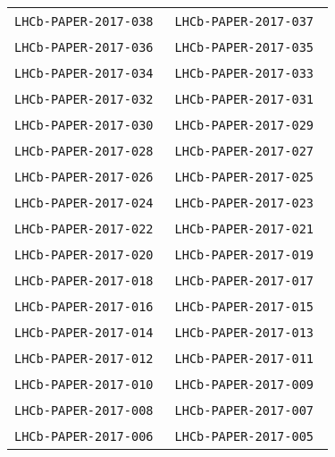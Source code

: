 \begin{center}
\begin{longtable}{ll}
\texttt{LHCb-PAPER-2017-038}~\cite{LHCb-PAPER-2017-038} &
\texttt{LHCb-PAPER-2017-037}~\cite{LHCb-PAPER-2017-037} \\
\texttt{LHCb-PAPER-2017-036}~\cite{LHCb-PAPER-2017-036} &
\texttt{LHCb-PAPER-2017-035}~\cite{LHCb-PAPER-2017-035} \\
\texttt{LHCb-PAPER-2017-034}~\cite{LHCb-PAPER-2017-034} &
\texttt{LHCb-PAPER-2017-033}~\cite{LHCb-PAPER-2017-033} \\
\texttt{LHCb-PAPER-2017-032}~\cite{LHCb-PAPER-2017-032} &
\texttt{LHCb-PAPER-2017-031}~\cite{LHCb-PAPER-2017-031} \\
\texttt{LHCb-PAPER-2017-030}~\cite{LHCb-PAPER-2017-030} &
\texttt{LHCb-PAPER-2017-029}~\cite{LHCb-PAPER-2017-029} \\
\texttt{LHCb-PAPER-2017-028}~\cite{LHCb-PAPER-2017-028} &
\texttt{LHCb-PAPER-2017-027}~\cite{LHCb-PAPER-2017-027} \\
\texttt{LHCb-PAPER-2017-026}~\cite{LHCb-PAPER-2017-026} &
\texttt{LHCb-PAPER-2017-025}~\cite{LHCb-PAPER-2017-025} \\
\texttt{LHCb-PAPER-2017-024}~\cite{LHCb-PAPER-2017-024} &
\texttt{LHCb-PAPER-2017-023}~\cite{LHCb-PAPER-2017-023} \\
\texttt{LHCb-PAPER-2017-022}~\cite{LHCb-PAPER-2017-022} &
\texttt{LHCb-PAPER-2017-021}~\cite{LHCb-PAPER-2017-021} \\
\texttt{LHCb-PAPER-2017-020}~\cite{LHCb-PAPER-2017-020} &
\texttt{LHCb-PAPER-2017-019}~\cite{LHCb-PAPER-2017-019} \\
\texttt{LHCb-PAPER-2017-018}~\cite{LHCb-PAPER-2017-018} &
\texttt{LHCb-PAPER-2017-017}~\cite{LHCb-PAPER-2017-017} \\
\texttt{LHCb-PAPER-2017-016}~\cite{LHCb-PAPER-2017-016} &
\texttt{LHCb-PAPER-2017-015}~\cite{LHCb-PAPER-2017-015} \\
\texttt{LHCb-PAPER-2017-014}~\cite{LHCb-PAPER-2017-014} &
\texttt{LHCb-PAPER-2017-013}~\cite{LHCb-PAPER-2017-013} \\
\texttt{LHCb-PAPER-2017-012}~\cite{LHCb-PAPER-2017-012} &
\texttt{LHCb-PAPER-2017-011}~\cite{LHCb-PAPER-2017-011} \\
\texttt{LHCb-PAPER-2017-010}~\cite{LHCb-PAPER-2017-010} &
\texttt{LHCb-PAPER-2017-009}~\cite{LHCb-PAPER-2017-009} \\
\texttt{LHCb-PAPER-2017-008}~\cite{LHCb-PAPER-2017-008} &
\texttt{LHCb-PAPER-2017-007}~\cite{LHCb-PAPER-2017-007} \\
\texttt{LHCb-PAPER-2017-006}~\cite{LHCb-PAPER-2017-006} &
\texttt{LHCb-PAPER-2017-005}~\cite{LHCb-PAPER-2017-005} \\

\end{longtable}
\end{center}
